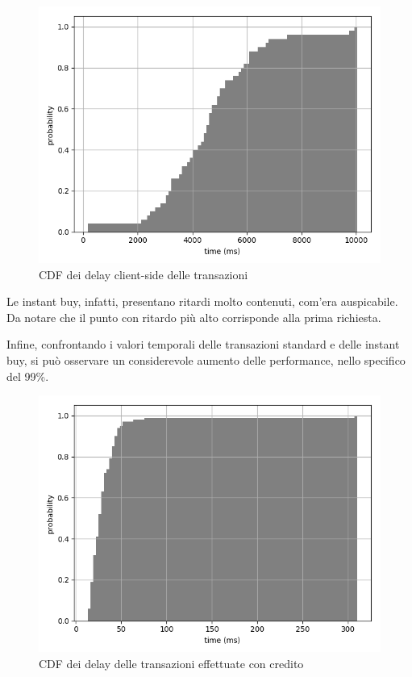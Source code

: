 \begin{figure}[h!t]
\centerline{\includegraphics[width=\textwidth]{img/client-side-delay-grey}}
\caption{CDF dei delay client-side delle transazioni}
\label{f:calcoli:client}
\end{figure}

Le instant buy, infatti, presentano ritardi molto contenuti, com'era auspicabile. Da notare che il punto con ritardo più alto corrisponde alla prima richiesta.

Infine, confrontando i valori temporali delle transazioni standard e delle instant buy, si può osservare un considerevole aumento delle performance, nello specifico del 99\%.

\begin{figure}[h!t]
\centerline{\includegraphics[width=\textwidth]{img/instant-buy-delay-grey}}
\caption{CDF dei delay delle transazioni effettuate con credito}
\label{f:calcoli:instant}
\end{figure}

